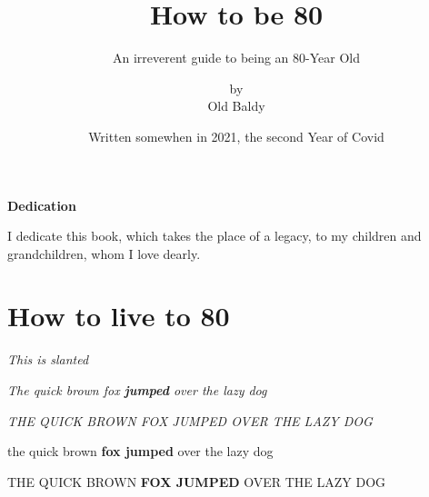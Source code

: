 \documentclass[15pt, landscape, oneside]{scrbook}
\title{{\Huge \textbf{How to be 80}}}
\subtitle{{\normalsize An irreverent guide to being an 80-Year Old}}
\author{by \\ Old Baldy}
\date{{\small Written somewhen in 2021, the second Year of Covid}}
\begin{document}
\begin{frontmatter}
		
\maketitle[1]
\begin{center}
	{\LARGE \textbf{Dedication}}
	
	I dedicate this book, which takes the place of a legacy, to my children and grandchildren, whom I love dearly.
\end{center}
\end{frontmatter}

	\chapter*{How to live to 80}

	\textsl{This is slanted}
	
	\textit{The quick brown fox \textbf{jumped} over the lazy dog} 
	
	\textit{THE QUICK BROWN FOX JUMPED OVER THE LAZY DOG}
	
	the quick brown \textbf{fox jumped} over the lazy dog
	
	THE QUICK BROWN \textbf{FOX JUMPED} OVER THE LAZY DOG
	
	
	
	
	
	\lipsum[20-23]
	
	\textit{\lipsum[30-33]}
\end{document}
